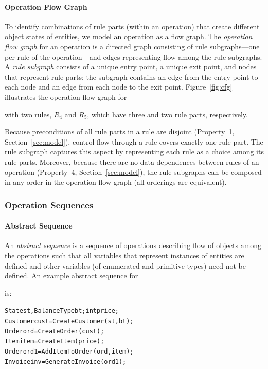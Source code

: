 \vskip -7pt
\paragraph*{Operation Flow Graph} To identify combinations of rule parts (within
an operation) that create different object states of entities, we model an
operation as a flow graph. The \textit{operation flow graph} for an operation is
a directed graph consisting of rule subgraphs---one per rule of the
operation---and edges representing flow among the rule subgraphs. A \textit{rule
  subgraph} consists of a unique entry point, a unique exit point, and nodes
that represent rule parts; the subgraph contains an edge from the entry point to
each node and an edge from each node to the exit point.  Figure~\ref{fig:cfg}
illustrates the operation flow graph for \subject{GenerateInvoice} with two
rules, $R_4$ and $R_5$, which have three and two rule parts, respectively.

Because preconditions of all rule parts in a rule are disjoint (Property~1,
Section~\ref{sec:model}), control flow through a rule covers exactly one rule
part.  The rule subgraph captures this aspect by representing each rule as a
choice among its rule parts. Moreover, because there are no data dependences
between rules of an operation (Property~4, Section~\ref{sec:model}), the rule
subgraphs can be composed in any order in the operation flow graph (\ie all
orderings are equivalent).

\subsubsection{Operation Sequences}

\vskip -10pt
\paragraph*{Abstract Sequence} An \textit{abstract sequence} is a sequence of
operations describing flow of objects among the operations such that all
variables that represent instances of entities are defined and other variables
(of enumerated and primitive types) need not be defined. An example abstract
sequence for \subject{GenerateInvoice} is:

\vspace*{-4pt}
{\scriptsize
\begin{alltt} 
 State st, BalanceType bt; int price;
 Customer cust = CreateCustomer(st, bt);
 Order ord = CreateOrder(cust);	 
 Item item = CreateItem(price);
 Order ord1 = AddItemToOrder(ord, item);
 Invoice inv = GenerateInvoice(ord1);  
\end{alltt}
}
\vspace*{-5pt}

